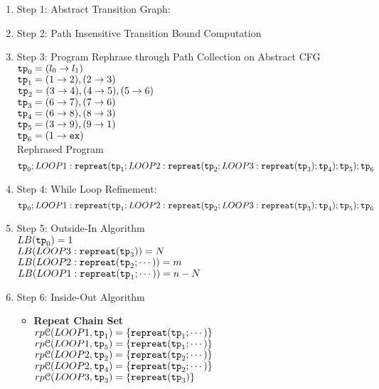 \begin{enumerate}
    \item Step 1: Abstract Transition Graph:

\item Step 2: Path Insensitive Transition Bound Computation

\item Step 3: Program Rephrase through Path Collection on Abstract CFG
\\
$\mathtt{tp}_0 = (l_0 \to l_1)$
\\
$\mathtt{tp}_1 = (1 \to 2),  (2 \to 3)$
\\
$\mathtt{tp}_2 = (3 \to 4), (4 \to 5), (5 \to 6)$
\\
$\mathtt{tp}_3 = (6 \to 7), (7 \to 6)$
\\
$\mathtt{tp}_4 = (6 \to 8), (8 \to 3)$
\\
$\mathtt{tp}_5 = (3 \to 9), (9 \to 1)$
\\
$\mathtt{tp}_6 = (1 \to \mathtt{ex})$
\\
Rephrased Program
\[
\mathtt{tp}_0 ; LOOP1: \mathtt{repreat}(\mathtt{tp}_1; LOOP2: \mathtt{repreat}(\mathtt{tp}_2; LOOP3 : \mathtt{repreat}(\mathtt{tp}_3); \mathtt{tp}_4); \mathtt{tp}_5); \mathtt{tp}_6
\]
\item Step 4: While Loop Refinement:
\[
\mathtt{tp}_0 ; LOOP1: \mathtt{repreat}(\mathtt{tp}_1; LOOP2: \mathtt{repreat}(\mathtt{tp}_2; LOOP3 : \mathtt{repreat}(\mathtt{tp}_3); \mathtt{tp}_4); \mathtt{tp}_5); \mathtt{tp}_6
\]
\item Step 5: Outside-In Algorithm
\\
$LB(\mathtt{tp}_0) = 1$
\\
$LB(LOOP3 : \mathtt{repreat}(\mathtt{tp}_3)) = N $
\\
$LB(LOOP2: \mathtt{repreat}(\mathtt{tp}_2; \cdots)) = m $
\\
$LB(LOOP1: \mathtt{repreat}(\mathtt{tp}_1; \cdots)) = n - N $
\\
\item Step 6: Inside-Out Algorithm
\begin{itemize}
    \item \textbf{Repeat Chain Set}
    \\
    $rp\mathcal{C}(LOOP1, \mathtt{tp}_1) = \{\mathtt{repreat}(\mathtt{tp}_1; \cdots)\}$ \\
    $rp\mathcal{C}(LOOP1, \mathtt{tp}_5) = \{\mathtt{repreat}(\mathtt{tp}_1; \cdots)\}$ \\
    $rp\mathcal{C}(LOOP2, \mathtt{tp}_2) = \{\mathtt{repreat}(\mathtt{tp}_2; \cdots)\}$ \\
    $rp\mathcal{C}(LOOP2, \mathtt{tp}_4) = \{\mathtt{repreat}(\mathtt{tp}_2; \cdots)\}$ \\
    $rp\mathcal{C}(LOOP3, \mathtt{tp}_3) = \{\mathtt{repreat}(\mathtt{tp}_3)\}$ \\

\end{itemize}
\end{enumerate}
